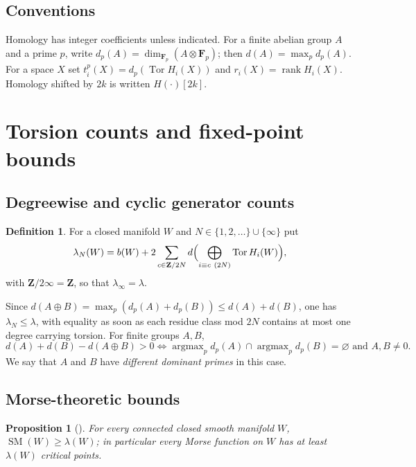 \documentclass[11pt]{amsart}
\numberwithin{equation}{section}
\newtheorem{proposition}[theorem]{Proposition}
\theoremstyle{definition}
\newtheorem{definition}[theorem]{Definition}
\theoremstyle{remark}
\newcommand{\Z}{\mathbf Z}
\newcommand{\F}{\mathbf F}
\DeclareMathOperator{\Tor}{Tor}
\DeclareMathOperator{\SM}{SM}
\DeclareMathOperator{\rank}{rank}
\begin{document}
\subsection{Conventions}
Homology has integer coefficients unless indicated. For a finite abelian
group $A$ and a prime $p$, write $d_p(A)=\dim_{\F_p}(A\otimes\F_p)$; then
$d(A)=\max_p d_p(A)$. For a space $X$ set $t_i^p(X)=d_p(\Tor H_i(X))$ and
$r_i(X)=\rank H_i(X)$. Homology shifted by $2k$ is written $H(\cdot)[2k]$.

\section{Torsion counts and fixed-point bounds}\label{sec:prelim}

\subsection{Degreewise and cyclic generator counts}

\begin{definition}\label{def:lambdaN}
For a closed manifold $W$ and $N\in\{1,2,\dots\}\cup\{\infty\}$ put
\[
  \lambda_N(W)=b(W)+2\sum_{c\in\Z/2N}
  d\Bigl(\bigoplus_{i\equiv c\ (2N)}\Tor H_i(W)\Bigr),
\]
with $\Z/2\infty=\Z$, so that $\lambda_\infty=\lambda$.
\end{definition}

Since $d(A\oplus B)=\max_p(d_p(A)+d_p(B))\le d(A)+d(B)$, one has
$\lambda_N\le\lambda$, with equality as soon as each residue class
mod $2N$ contains at most one degree carrying torsion. For finite groups
$A,B$,
\begin{equation}\label{eq:dsum}
  d(A)+d(B)-d(A\oplus B)>0\iff
  \operatorname{argmax}_p d_p(A)\cap\operatorname{argmax}_p d_p(B)=\varnothing
  \text{ and }A,B\ne0 .
\end{equation}
We say that $A$ and $B$ have \emph{different dominant primes} in this case.

\subsection{Morse-theoretic bounds}\label{subsec:morse}

\begin{proposition}[{\cite[Prop.~2.2]{OpenAI22}}]\label{prop:SMlower}
For every connected closed smooth manifold $W$, $\SM(W)\ge\lambda(W)$;
in particular every Morse function on $W$ has at least $\lambda(W)$
critical points.
\end{proposition}
\end{document}
